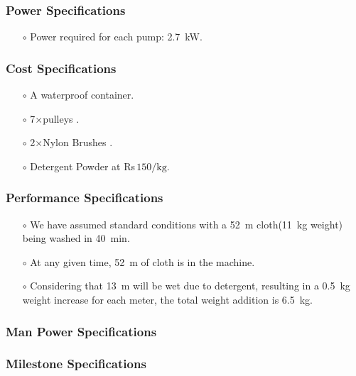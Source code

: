 \documentclass[12pt]{article}
\begin{document}
\subsubsection{Power Specifications}
\begin{itemize}
    \item[$\scriptstyle\circ$] Power required for each pump: \SI{2.7}{\kilo\watt}.
\end{itemize}
\subsubsection{Cost Specifications}
\begin{itemize}
    \item[$\scriptstyle\circ$] A waterproof container.
    \item[$\scriptstyle\circ$] 7$\times$pulleys .
    \item[$\scriptstyle\circ$] 2$\times$Nylon Brushes .
    \item[$\scriptstyle\circ$] Detergent Powder at Rs\(\,150/\text{kg}\).
    
    
\end{itemize}

\subsubsection{Performance Specifications}

\begin{itemize}
    \item[$\scriptstyle\circ$] We have assumed standard conditions with a \SI{52}{\meter} cloth(\SI{11}{\kilogram} weight) being washed in \SI{40}{\minute}.
     \item[$\scriptstyle\circ$] At any given time, \SI{52}{\meter} of cloth is in the machine. 
     \item[$\scriptstyle\circ$] Considering that \SI{13}{\meter} will be wet due to detergent, resulting in a \SI{0.5}{\kilogram} weight increase for each meter, the total weight addition is \SI{6.5}{\kilogram}. \cite{kane_evaluation_2012} \cite{eduok_effect_2021}


\end{itemize}
\subsubsection{Man Power Specifications}

\subsubsection{Milestone Specifications}
\end{document}
